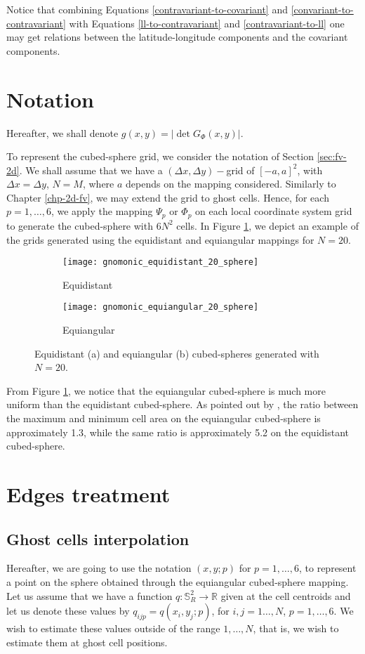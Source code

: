 Notice that combining Equations \eqref{contravariant-to-covariant}
and \eqref{convariant-to-contravariant} with Equations 
\eqref{ll-to-contravariant} and \eqref{contravariant-to-ll}
one may get relations between the latitude-longitude 
components and the covariant components.

\section{Notation}
\label{cs-notation}
Hereafter, we shall denote $g(x,y) = |\det{G_{\Phi}(x,y)}|$.

To represent the cubed-sphere grid, we consider the notation of Section \ref{sec:fv-2d}.
We shall assume that we have a $(\Delta x, \Delta y)-$grid of $[-a,a]^2$, with $\Delta x= \Delta y$, $N=M$,
where $a$ depends on the mapping considered.
Similarly to Chapter \ref{chp-2d-fv}, we may extend the grid to ghost cells.
Hence, for each $p=1, \ldots, 6$, we apply the mapping $\Psi_p$ or $\Phi_p$ on
each local coordinate system grid to generate the cubed-sphere with $6N^2$ cells.
In Figure \ref{chp4-cs-grid}, we depict an example of the grids generated using 
the equidistant and equiangular mappings for $N=20$.
\begin{figure}[!htb]
	\centering
	\begin{subfigure}{0.48\textwidth}
		\centering
		\texttt{[image: gnomonic\_equidistant\_20\_sphere]}
		\caption{Equidistant}
	\end{subfigure}
	\begin{subfigure}{0.48\textwidth}
		\centering
		\texttt{[image: gnomonic\_equiangular\_20\_sphere]}
		\caption{Equiangular}
	\end{subfigure}
	\caption{Equidistant (a) and equiangular (b) cubed-spheres generated with $N=20$.
		\label{chp4-cs-grid}}
\end{figure}

From Figure \ref{chp4-cs-grid}, we notice that the equiangular cubed-sphere is much more uniform
than the equidistant cubed-sphere. As pointed out by \citet{rancic:1996}, the ratio
between the maximum and minimum cell area on the equiangular cubed-sphere is approximately 1.3,
while the same ratio is approximately 5.2 on the equidistant cubed-sphere. 


\section{Edges treatment}
\label{cs-halodata}
\subsection{Ghost cells interpolation}
\label{cs-interp}
Hereafter, we are going to use the notation $(x,y;p)$ for $p=1,\ldots, 6$, to represent a point on the sphere obtained through the equiangular cubed-sphere mapping.
Let us assume that we have a function $q: \mathbb{S}^2_R \to \mathbb{R}$
given at the cell centroids and let us denote these values by $q_{ijp} = q(x_i,y_j;p)$,
for $i, j=1\ldots, N$, $p=1,\ldots, 6$. We wish to estimate these values outside of the range $1, \ldots, N$, that is, we wish to estimate them at ghost cell positions.

